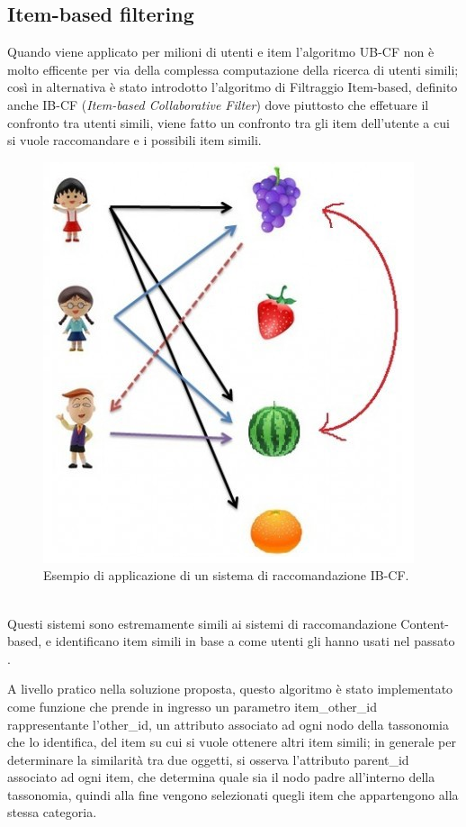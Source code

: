 \newpage

\subsection{Item-based filtering} 
Quando viene applicato per milioni di utenti e item l'algoritmo UB-CF non è molto efficente per via della complessa computazione della 
ricerca di utenti simili; così in alternativa è stato introdotto l'algoritmo di Filtraggio Item-based, definito anche IB-CF 
(\textit{Item-based Collaborative Filter}) dove piuttosto che effetuare il confronto tra utenti simili, viene fatto un confronto tra 
gli item dell'utente a cui si vuole raccomandare e i possibili item simili.

\begin{figure}[ht!]
	\centering
	\includegraphics[scale=0.5]{images/IB_CF_ex.png}
	\caption{Esempio di applicazione di un sistema di raccomandazione IB-CF.}
	\label{fig:IB_CF}
\end{figure}
\ \\
Questi sistemi sono estremamente simili ai sistemi di raccomandazione Content-based, e identificano item simili in base a come utenti gli
hanno usati nel passato \cite{item-based-collaborative-filtering}.

A livello pratico nella soluzione proposta, questo algoritmo è stato implementato come funzione che prende in ingresso un 
parametro item\_other\_id rappresentante l'other\_id, un attributo associato ad ogni nodo della tassonomia che lo identifica,
del item su cui si vuole ottenere altri item simili; in generale per determinare la similarità tra due oggetti, si osserva 
l'attributo parent\_id associato ad ogni item, che determina quale sia il nodo padre all'interno della tassonomia, quindi alla fine 
vengono selezionati quegli item che appartengono alla stessa categoria.\\


